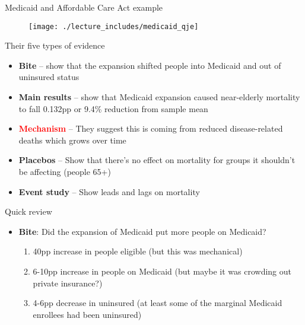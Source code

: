\documentclass{beamer}
\begin{document}
\begin{frame}{Medicaid and Affordable Care Act example}

\begin{figure}
\texttt{[image: ./lecture\_includes/medicaid\_qje]}
\end{figure}

\end{frame}

\begin{frame}{Their five types of evidence}

\begin{itemize}
\item \textbf{Bite} -- show that the expansion shifted people into Medicaid and out of uninsured status
\item \textbf{Main results} -- show that Medicaid expansion caused near-elderly mortality to fall 0.132pp or 9.4\% reduction from sample mean
\item \textcolor{red}{\textbf{Mechanism}} -- They suggest this is coming from reduced disease-related deaths which grows over time
\item \textbf{Placebos} -- Show that there's no effect on mortality for groups it shouldn't be affecting (people 65+)
\item \textbf{Event study} -- Show leads and lags on mortality
\end{itemize}

\end{frame}





\begin{frame}{Quick review}

\begin{itemize}

\item \textbf{Bite}: Did the expansion of Medicaid put more people on Medicaid?
	\begin{enumerate}
	\item 40pp increase in people eligible (but this was mechanical)
	\item 6-10pp increase in people on Medicaid (but maybe it was crowding out private insurance?)
	\item 4-6pp decrease in uninsured (at least some of the marginal Medicaid enrollees had been uninsured)
	\end{enumerate}
\end{itemize}

\end{frame}
\end{document}
